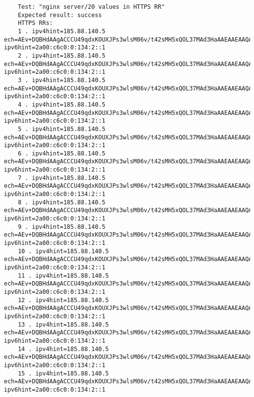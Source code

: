 \begin{verbatim}
    Test: "nginx server/20 values in HTTPS RR"
    Expected result: success
    HTTPS RRs:
    1 . ipv4hint=185.88.140.5 ech=AEv+DQBHdAAgACCCU49qdxKOUXJPs3wlsM06v/t42sMH5xQOL37MAd3HaAAEAAEAAQAYb3RoZXJwdWJsaWMudGVzdC5kZWZvLmllAAA= ipv6hint=2a00:c6c0:0:134:2::1
    2 . ipv4hint=185.88.140.5 ech=AEv+DQBHdAAgACCCU49qdxKOUXJPs3wlsM06v/t42sMH5xQOL37MAd3HaAAEAAEAAQAYb3RoZXJwdWJsaWMudGVzdC5kZWZvLmllAAA= ipv6hint=2a00:c6c0:0:134:2::1
    3 . ipv4hint=185.88.140.5 ech=AEv+DQBHdAAgACCCU49qdxKOUXJPs3wlsM06v/t42sMH5xQOL37MAd3HaAAEAAEAAQAYb3RoZXJwdWJsaWMudGVzdC5kZWZvLmllAAA= ipv6hint=2a00:c6c0:0:134:2::1
    4 . ipv4hint=185.88.140.5 ech=AEv+DQBHdAAgACCCU49qdxKOUXJPs3wlsM06v/t42sMH5xQOL37MAd3HaAAEAAEAAQAYb3RoZXJwdWJsaWMudGVzdC5kZWZvLmllAAA= ipv6hint=2a00:c6c0:0:134:2::1
    5 . ipv4hint=185.88.140.5 ech=AEv+DQBHdAAgACCCU49qdxKOUXJPs3wlsM06v/t42sMH5xQOL37MAd3HaAAEAAEAAQAYb3RoZXJwdWJsaWMudGVzdC5kZWZvLmllAAA= ipv6hint=2a00:c6c0:0:134:2::1
    6 . ipv4hint=185.88.140.5 ech=AEv+DQBHdAAgACCCU49qdxKOUXJPs3wlsM06v/t42sMH5xQOL37MAd3HaAAEAAEAAQAYb3RoZXJwdWJsaWMudGVzdC5kZWZvLmllAAA= ipv6hint=2a00:c6c0:0:134:2::1
    7 . ipv4hint=185.88.140.5 ech=AEv+DQBHdAAgACCCU49qdxKOUXJPs3wlsM06v/t42sMH5xQOL37MAd3HaAAEAAEAAQAYb3RoZXJwdWJsaWMudGVzdC5kZWZvLmllAAA= ipv6hint=2a00:c6c0:0:134:2::1
    8 . ipv4hint=185.88.140.5 ech=AEv+DQBHdAAgACCCU49qdxKOUXJPs3wlsM06v/t42sMH5xQOL37MAd3HaAAEAAEAAQAYb3RoZXJwdWJsaWMudGVzdC5kZWZvLmllAAA= ipv6hint=2a00:c6c0:0:134:2::1
    9 . ipv4hint=185.88.140.5 ech=AEv+DQBHdAAgACCCU49qdxKOUXJPs3wlsM06v/t42sMH5xQOL37MAd3HaAAEAAEAAQAYb3RoZXJwdWJsaWMudGVzdC5kZWZvLmllAAA= ipv6hint=2a00:c6c0:0:134:2::1
    10 . ipv4hint=185.88.140.5 ech=AEv+DQBHdAAgACCCU49qdxKOUXJPs3wlsM06v/t42sMH5xQOL37MAd3HaAAEAAEAAQAYb3RoZXJwdWJsaWMudGVzdC5kZWZvLmllAAA= ipv6hint=2a00:c6c0:0:134:2::1
    11 . ipv4hint=185.88.140.5 ech=AEv+DQBHdAAgACCCU49qdxKOUXJPs3wlsM06v/t42sMH5xQOL37MAd3HaAAEAAEAAQAYb3RoZXJwdWJsaWMudGVzdC5kZWZvLmllAAA= ipv6hint=2a00:c6c0:0:134:2::1
    12 . ipv4hint=185.88.140.5 ech=AEv+DQBHdAAgACCCU49qdxKOUXJPs3wlsM06v/t42sMH5xQOL37MAd3HaAAEAAEAAQAYb3RoZXJwdWJsaWMudGVzdC5kZWZvLmllAAA= ipv6hint=2a00:c6c0:0:134:2::1
    13 . ipv4hint=185.88.140.5 ech=AEv+DQBHdAAgACCCU49qdxKOUXJPs3wlsM06v/t42sMH5xQOL37MAd3HaAAEAAEAAQAYb3RoZXJwdWJsaWMudGVzdC5kZWZvLmllAAA= ipv6hint=2a00:c6c0:0:134:2::1
    14 . ipv4hint=185.88.140.5 ech=AEv+DQBHdAAgACCCU49qdxKOUXJPs3wlsM06v/t42sMH5xQOL37MAd3HaAAEAAEAAQAYb3RoZXJwdWJsaWMudGVzdC5kZWZvLmllAAA= ipv6hint=2a00:c6c0:0:134:2::1
    15 . ipv4hint=185.88.140.5 ech=AEv+DQBHdAAgACCCU49qdxKOUXJPs3wlsM06v/t42sMH5xQOL37MAd3HaAAEAAEAAQAYb3RoZXJwdWJsaWMudGVzdC5kZWZvLmllAAA= ipv6hint=2a00:c6c0:0:134:2::1

\end{verbatim}

